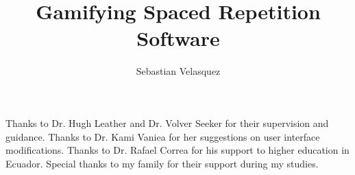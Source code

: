\documentclass[msc, ai, logo, oneside, fullpacing]{infthesis}
\title{Gamifying Spaced Repetition Software}
\author{Sebastian Velasquez}
\begin{document}
\begin{preliminary}

\maketitle

\begin{acknowledgements}
Thanks to Dr. Hugh Leather and Dr. Volver Seeker for their supervision and guidance. Thanks to Dr. Kami Vaniea for her suggestions on user interface modifications. Thanks to Dr. Rafael Correa for his support to higher education in Ecuador. Special thanks to my family for their support during my studies.
\end{acknowledgements}

\standarddeclaration


\tableofcontents

\listoffigures
\listoftables

\end{preliminary}









\appendix
% 






\end{document}
